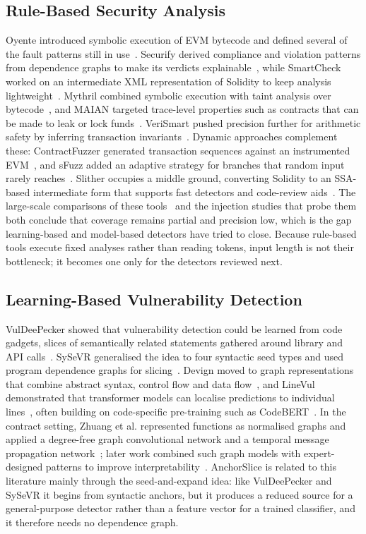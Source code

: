 \documentclass{ieeeaccess}
\begin{document}
\subsection{Rule-Based Security Analysis}\label{subsec:rw_rule}
Oyente introduced symbolic execution of EVM bytecode and defined several of the fault patterns still in use~\cite{luu2016}. Securify derived compliance and violation patterns from dependence graphs to make its verdicts explainable~\cite{tsankov2018}, while SmartCheck worked on an intermediate XML representation of Solidity to keep analysis lightweight~\cite{tikhomirov2018}. Mythril combined symbolic execution with taint analysis over bytecode~\cite{mythril}, and MAIAN targeted trace-level properties such as contracts that can be made to leak or lock funds~\cite{nikolic2018}. VeriSmart pushed precision further for arithmetic safety by inferring transaction invariants~\cite{so2020}. Dynamic approaches complement these: ContractFuzzer generated transaction sequences against an instrumented EVM~\cite{jiang2018contractfuzzer}, and sFuzz added an adaptive strategy for branches that random input rarely reaches~\cite{nguyen2020sfuzz}. Slither occupies a middle ground, converting Solidity to an SSA-based intermediate form that supports fast detectors and code-review aids~\cite{feist2019}. The large-scale comparisons of these tools~\cite{durieux2020} and the injection studies that probe them~\cite{ghaleb2020} both conclude that coverage remains partial and precision low, which is the gap learning-based and model-based detectors have tried to close. Because rule-based tools execute fixed analyses rather than reading tokens, input length is not their bottleneck; it becomes one only for the detectors reviewed next.

\subsection{Learning-Based Vulnerability Detection}\label{subsec:rw_learning}
VulDeePecker showed that vulnerability detection could be learned from code gadgets, slices of semantically related statements gathered around library and API calls~\cite{li2018vuldeepecker}. SySeVR generalised the idea to four syntactic seed types and used program dependence graphs for slicing~\cite{li2022sysevr}. Devign moved to graph representations that combine abstract syntax, control flow and data flow~\cite{zhou2019devign}, and LineVul demonstrated that transformer models can localise predictions to individual lines~\cite{fu2022linevul}, often building on code-specific pre-training such as CodeBERT~\cite{feng2020codebert}. In the contract setting, Zhuang et al. represented functions as normalised graphs and applied a degree-free graph convolutional network and a temporal message propagation network~\cite{zhuang2020}; later work combined such graph models with expert-designed patterns to improve interpretability~\cite{liu2023combining}. AnchorSlice is related to this literature mainly through the seed-and-expand idea: like VulDeePecker and SySeVR it begins from syntactic anchors, but it produces a reduced source for a general-purpose detector rather than a feature vector for a trained classifier, and it therefore needs no dependence graph.
\end{document}
